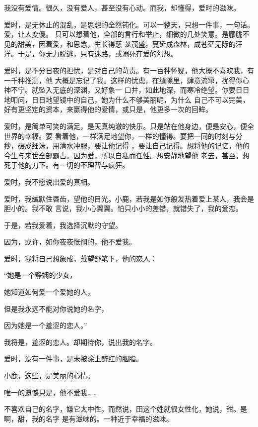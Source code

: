 \documentclass[12pt,a4paper]{article}
\begin{document}
		我没有爱情。很久，没有爱人，甚至没有心动。而我，却懂得，爱时的滋味。

		爱时，是无休止的混乱，是思想的全然钝化。可以一整天，只想一件事，一句话。爱，让人变傻。
	只可以想着他，全部的言行和举止，细微的几处笑意。是朦胧不见的甜美，因着爱，和思念，生长得葱
	茏茂盛。蔓延成森林，成苍茫无际的汪洋。于是，你无力脱逃，只有迷路，或溺死在爱的幻想。

		爱时，是不分日夜的担忧，是对自己的苛责。有一百种怀疑，他大概不喜欢我，有一千种推测，他
	大概是忘记了我。这样的忧虑，在缝隙里，肆意流窜，扰得你心神不宁。就坠入无底的深渊，又好象一
	口井，如此地深，而寒冷绝望。你要日日地叩问，日日地望镜中的自己，她为什么不够美丽呢，为什么
	自己不可以完美，好有更坚定的资本，来赢得他的爱情，或只是，他更多一次的回眸。

		爱时，是简单可笑的满足，是天真纯澈的快乐。只是站在他身边，便是安心，便全世界的幸福。要
	看着他，一样满足地望你，一样的懂得。要把一同的时刻与分秒，碾成细沫，用清水冲服，要让他记得
	，要让自己记得。想将他的记忆，他的今生与来世全部霸占。因为爱，所以自私而任性。想安静地望他
	老去，甚至，想死于他的刀下。有一切的不理智与疯狂。

		爱时，我不愿说出爱的真相。

		爱时，我缄默住唇齿，望他的目光。小鹿，若我是如你般发热着爱上某人，我会是胆小的。我不敢
	言说，我小心翼翼。怕只小小的差错，就错失了，我的爱恋。


		于是，若我爱着，我选择沉默的守望。\par
		因为，或许，如你夜夜怅惘的，他不爱我。\par
		爱时，我将自己想象成，戴望舒笔下，他的恋人：\par
		“她是一个静娴的少女，\par
		她知道如何爱一个爱她的人，\par
		但是我永远不能对你说她的名字，\par
		因为她是一个羞涩的恋人。”\par
		我将是，羞涩的恋人。却期待你，说出我的名字。\par
		爱时，没有一件事，是未被涂上醉红的胭脂。\par
		小鹿，这些，是美丽的心情。\par
		唯一的遗憾只是，他不爱我……

	\endwriting



		不喜欢自己的名字，嫌它太中性。而然说，田这个姓就很女性化，她说，甜。是啊，甜，我的名字
	是有滋味的。一种近于幸福的滋味。
\end{document}
